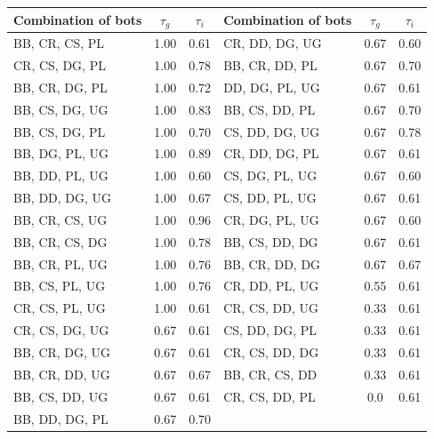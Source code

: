 \begin{table}[ht!]
\centering
\small
\begin{tabular}{lcclcc}
\toprule
Combination of bots & $\tau_{g}$ & $\tau_{i}$ & Combination of bots & $\tau_{g}$ & $\tau_{i}$ \\ \midrule
BB, CR, CS, PL & 1.00 &0.61 & CR, DD, DG, UG & 0.67 & 0.60   \\
CR, CS, DG, PL & 1.00 & 0.78 & BB, CR, DD, PL & 0.67 & 0.70 \\
BB, CR, DG, PL & 1.00 & 0.72 & DD, DG, PL, UG & 0.67 & 0.61\\
BB, CS, DG, UG & 1.00 & 0.83 & BB, CS, DD, PL & 0.67 & 0.70 \\
BB, CS, DG, PL & 1.00 & 0.70 & CS, DD, DG, UG & 0.67 & 0.78\\
BB, DG, PL, UG & 1.00 & 0.89 & CR, DD, DG, PL & 0.67 & 0.61\\
BB, DD, PL, UG & 1.00 & 0.60 & CS, DG, PL, UG & 0.67 & 0.60\\
BB, DD, DG, UG & 1.00 & 0.67 & CS, DD, PL, UG & 0.67 & 0.61\\
BB, CR, CS, UG & 1.00 &0.96  & CR, DG, PL, UG & 0.67 & 0.60 \\
BB, CR, CS, DG & 1.00 & 0.78 & BB, CS, DD, DG & 0.67 & 0.61 \\
BB, CR, PL, UG & 1.00 & 0.76 & BB, CR, DD, DG & 0.67 & 0.67 \\
BB, CS, PL, UG & 1.00 & 0.76 & CR, DD, PL, UG & 0.55 & 0.61\\
CR, CS, PL, UG & 1.00 &0.61  & CR, CS, DD, UG & 0.33 & 0.61   \\
CR, CS, DG, UG & 0.67 & 0.61 & CS, DD, DG, PL & 0.33 & 0.61 \\
BB, CR, DG, UG & 0.67 & 0.61 & CR, CS, DD, DG & 0.33 & 0.61\\
BB, CR, DD, UG & 0.67 & 0.67 & BB, CR, CS, DD & 0.33 & 0.61\\
BB, CS, DD, UG & 0.67 & 0.61 & CR, CS, DD, PL & 0.0 & 0.61\\
BB, DD, DG, PL & 0.67 & 0.70 & & & \\

\end{tabular}
\end{table}
